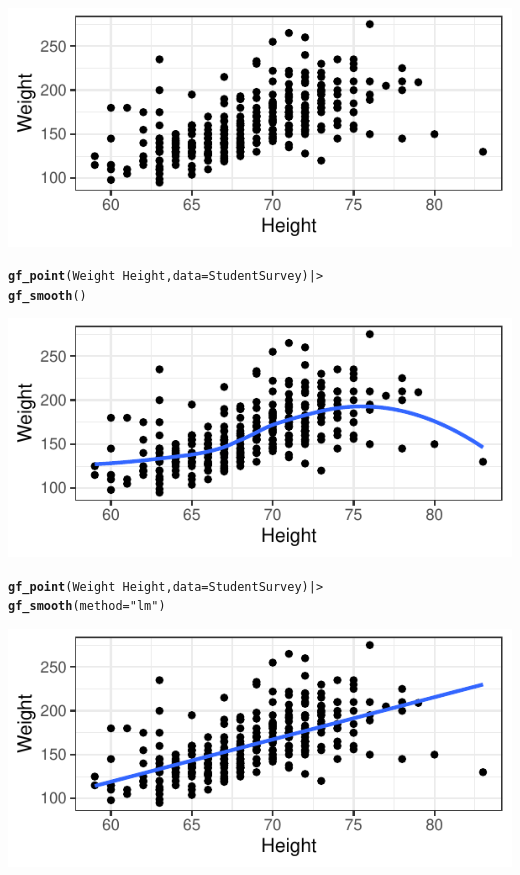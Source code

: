 \documentclass[10pt]{report}\usepackage[]{graphicx}\usepackage[]{xcolor}
\makeatletter
\newcommand{\hlsng}[1]{\textcolor[rgb]{0.192,0.494,0.8}{#1}}%
\newcommand{\hlopt}[1]{\textcolor[rgb]{0,0,0}{#1}}%
\newcommand{\hldef}[1]{\textcolor[rgb]{0.345,0.345,0.345}{#1}}%
\newcommand{\hlkwc}[1]{\textcolor[rgb]{0.333,0.667,0.333}{#1}}%
\newcommand{\hlkwd}[1]{\textcolor[rgb]{0.737,0.353,0.396}{\textbf{#1}}}%
\newenvironment{kframe}{%
 \def\at@end@of@kframe{}%
 \ifinner\ifhmode%
  \def\at@end@of@kframe{\end{minipage}}%
  \begin{minipage}{\columnwidth}%
 \fi\fi%
 \def\FrameCommand##1{\hskip\@totalleftmargin \hskip-\fboxsep
 \colorbox{shadecolor}{##1}\hskip-\fboxsep
     \hskip-\linewidth \hskip-\@totalleftmargin \hskip\columnwidth}%
 \MakeFramed {\advance\hsize-\width
   \@totalleftmargin\z@ \linewidth\hsize
   \@setminipage}}%
 {\par\unskip\endMakeFramed%
 \at@end@of@kframe}
\newenvironment{knitrout}{}{} %
\makeatother
\begin{document}
\begin{multicols}{3}
\begin{knitrout}
{\centering \includegraphics[width=.25\textwidth,height=.125\textwidth]{figure/unnamed-chunk-29-1} 

}


\end{knitrout}
\vspace*{-.20in}
\begin{knitrout}\footnotesize
{}\color{fgcolor}\begin{kframe}
\begin{alltt}
\hlkwd{gf_point}\hldef{(Weight} \hlopt{~} \hldef{Height,} \hlkwc{data} \hldef{= StudentSurvey)  |>}
  \hlkwd{gf_smooth}\hldef{()}
\end{alltt}
\end{kframe}

{\centering \includegraphics[width=.25\textwidth,height=.125\textwidth]{figure/unnamed-chunk-30-1} 

}


\end{knitrout}
\vspace*{-.20in}
\begin{knitrout}\footnotesize
{}\color{fgcolor}\begin{kframe}
\begin{alltt}
\hlkwd{gf_point}\hldef{(Weight} \hlopt{~} \hldef{Height,} \hlkwc{data} \hldef{= StudentSurvey)  |>}
  \hlkwd{gf_smooth}\hldef{(}\hlkwc{method} \hldef{=} \hlsng{"lm"}\hldef{)}
\end{alltt}
\end{kframe}

{\centering \includegraphics[width=.25\textwidth,height=.125\textwidth]{figure/unnamed-chunk-31-1} 

}


\end{knitrout}
\vspace*{-.20in}
\end{multicols}
\end{document}
